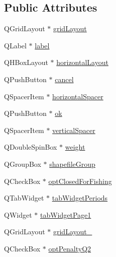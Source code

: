 \subsection*{Public Attributes}
\begin{DoxyCompactItemize}
\item 
Q\+Grid\+Layout $\ast$ \mbox{\hyperlink{class_ui___path_penalty_dialog_ada4d7e64f2fd4d11ee4689ad6e6a24e8}{grid\+Layout}}
\item 
Q\+Label $\ast$ \mbox{\hyperlink{class_ui___path_penalty_dialog_a5d237355d7a09ee376626b530e1c4b8e}{label}}
\item 
Q\+H\+Box\+Layout $\ast$ \mbox{\hyperlink{class_ui___path_penalty_dialog_adc83d43ef1d9056df2b317373faa034c}{horizontal\+Layout}}
\item 
Q\+Push\+Button $\ast$ \mbox{\hyperlink{class_ui___path_penalty_dialog_a1002141d0d1089fe3378c1278ee6e7d5}{cancel}}
\item 
Q\+Spacer\+Item $\ast$ \mbox{\hyperlink{class_ui___path_penalty_dialog_a2cb580fe692c0087726bddd4f8b005ad}{horizontal\+Spacer}}
\item 
Q\+Push\+Button $\ast$ \mbox{\hyperlink{class_ui___path_penalty_dialog_aa200c25ad243a59c2765c556f45a54c1}{ok}}
\item 
Q\+Spacer\+Item $\ast$ \mbox{\hyperlink{class_ui___path_penalty_dialog_ac0db124c0d62e41889d0057bb5f9e2fa}{vertical\+Spacer}}
\item 
Q\+Double\+Spin\+Box $\ast$ \mbox{\hyperlink{class_ui___path_penalty_dialog_a146882b6fa95b928f614fd259fcdb0f6}{weight}}
\item 
Q\+Group\+Box $\ast$ \mbox{\hyperlink{class_ui___path_penalty_dialog_adda90569116889fc62a756cfa7e091d4}{shapefile\+Group}}
\item 
Q\+Check\+Box $\ast$ \mbox{\hyperlink{class_ui___path_penalty_dialog_a941f5ba13a01f945037bea0972cf0e57}{opt\+Closed\+For\+Fishing}}
\item 
Q\+Tab\+Widget $\ast$ \mbox{\hyperlink{class_ui___path_penalty_dialog_a117fb1e1d4e6aa8454ae443fa75c8efe}{tab\+Widget\+Periods}}
\item 
Q\+Widget $\ast$ \mbox{\hyperlink{class_ui___path_penalty_dialog_a3ae902234709cc276ef5e9e44cf24a41}{tab\+Widget\+Page1}}
\item 
Q\+Grid\+Layout $\ast$ \mbox{\hyperlink{class_ui___path_penalty_dialog_aab2925c0b0e0836551c0e6015fade61d}{grid\+Layout\+\_}}
\item 
Q\+Check\+Box $\ast$ \mbox{\hyperlink{class_ui___path_penalty_dialog_acf8d14cf6a3bd83209d3310468c885cb}{opt\+Penalty\+Q2}}

\end{DoxyCompactItemize}
